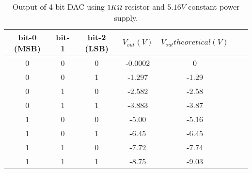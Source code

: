 \begin{table}[H]
    \centering
    \begin{tabular}{|c|c|c|c|c|c|c|}
        \hline
        bit-0 (MSB) & bit-1 & bit-2 (LSB) & $V_{out} (V)$ & $ V_{out} theoretical (V)$ \\ \hline
        0           & 0     & 0           & -0.0002       & 0                          \\ \hline
        0           & 0     & 1           & -1.297        & -1.29                      \\ \hline
        0           & 1     & 0           & -2.582        & -2.58                      \\ \hline
        0           & 1     & 1           & -3.883        & -3.87                      \\ \hline
        1           & 0     & 0           & -5.00         & -5.16                      \\ \hline
        1           & 0     & 1           & -6.45         & -6.45                      \\ \hline
        1           & 1     & 0           & -7.72         & -7.74                      \\ \hline
        1           & 1     & 1           & -8.75         & -9.03                      \\ \hline
    \end{tabular}
    \caption{Output of 4 bit DAC using $1K\ohm$ resistor and $5.16V$ constant power supply.}
    \label{tab:1}
\end{table}